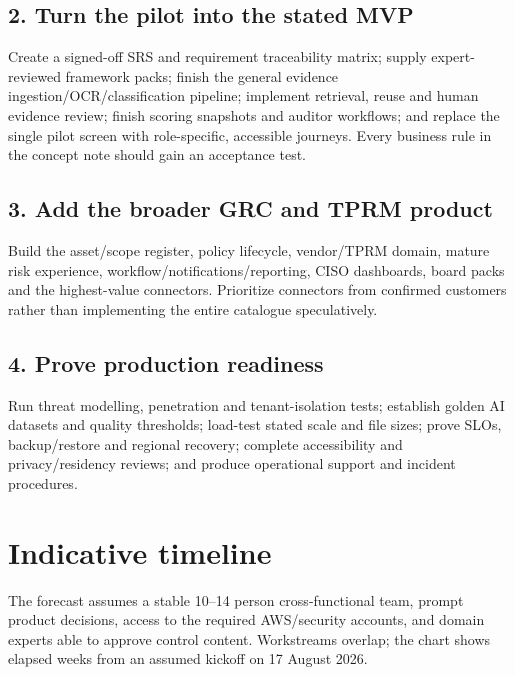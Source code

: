 \documentclass[11pt,a4paper]{article}
\begin{document}
\subsection{2. Turn the pilot into the stated MVP}

Create a signed-off SRS and requirement traceability matrix; supply expert-reviewed
framework packs; finish the general evidence ingestion/OCR/classification pipeline;
implement retrieval, reuse and human evidence review; finish scoring snapshots and
auditor workflows; and replace the single pilot screen with role-specific,
accessible journeys. Every business rule in the concept note should gain an
acceptance test.

\subsection{3. Add the broader GRC and TPRM product}

Build the asset/scope register, policy lifecycle, vendor/TPRM domain, mature risk
experience, workflow/notifications/reporting, CISO dashboards, board packs and the
highest-value connectors. Prioritize connectors from confirmed customers rather
than implementing the entire catalogue speculatively.

\subsection{4. Prove production readiness}

Run threat modelling, penetration and tenant-isolation tests; establish golden AI
datasets and quality thresholds; load-test stated scale and file sizes; prove SLOs,
backup/restore and regional recovery; complete accessibility and privacy/residency
reviews; and produce operational support and incident procedures.

\section{Indicative timeline}

The forecast assumes a stable 10--14 person cross-functional team, prompt product
decisions, access to the required AWS/security accounts, and domain experts able to
approve control content. Workstreams overlap; the chart shows elapsed weeks from an
assumed kickoff on 17 August 2026.
\end{document}
